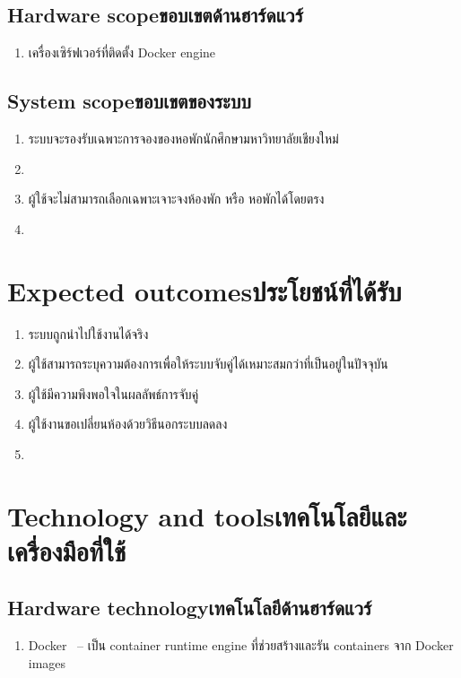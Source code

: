 \subsection{\ifenglish Hardware scope\else ขอบเขตด้านฮาร์ดแวร์\fi}
\begin{enumerate}
    \item เครื่องเซิร์ฟเวอร์ที่ติดตั้ง Docker engine
\end{enumerate}
\subsection{\ifenglish System scope\else ขอบเขตของระบบ\fi}
\begin{enumerate}
    \item ระบบจะรองรับเฉพาะการจองของหอพักนักศึกษามหาวิทยาลัยเชียงใหม่
    \item {}
    \item ผู้ใช้จะไม่สามารถเลือกเฉพาะเจาะจงห้องพัก หรือ หอพักได้โดยตรง
    \item {}
\end{enumerate}

\section{\ifenglish Expected outcomes\else ประโยชน์ที่ได้รับ\fi}
\begin{enumerate}
    \item ระบบถูกนำไปใช้งานได้จริง
    \item ผู้ใช้สามารถระบุความต้องการเพื่อให้ระบบจับคู่ได้เหมาะสมกว่าที่เป็นอยู่ในปัจจุบัน
    \item ผู้ใช้มีความพึงพอใจในผลลัพธ์การจับคู่
    \item ผู้ใช้งานขอเปลี่ยนห้องด้วยวิธีนอกระบบลดลง
    \item {}
\end{enumerate}

\section{\ifenglish Technology and tools\else เทคโนโลยีและเครื่องมือที่ใช้\fi}

\subsection{\ifenglish Hardware technology\else เทคโนโลยีด้านฮาร์ดแวร์\fi}
\begin{enumerate}
    \item Docker~\cite{dke} -- เป็น container runtime engine ที่ช่วยสร้างและรัน containers จาก Docker images
\end{enumerate}

